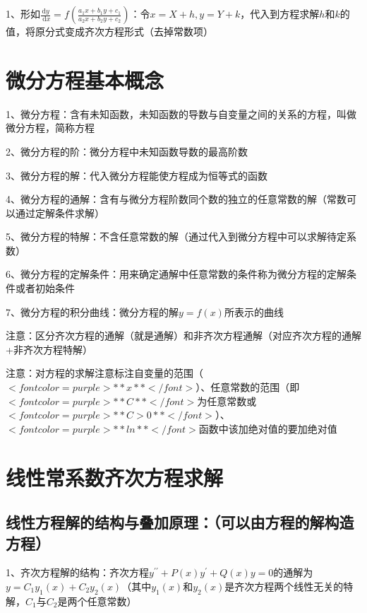 1、形如$ \frac{\mathrm{d} y}{\mathrm{~d} x}=f\left(\frac{a_{1} x+b_{1} y+c_{1}}{a_{2} x+b_{2} y+c_{2}}\right) $：令$ x=X+h, y=Y+k $，代入到方程求解$ h $和$ k $的值，将原分式变成齐次方程形式（去掉常数项）

\section{微分方程基本概念}

1、微分方程：含有未知函数，未知函数的导数与自变量之间的关系的方程，叫做微分方程，简称方程

2、微分方程的阶：微分方程中未知函数导数的最高阶数

3、微分方程的解：代入微分方程能使方程成为恒等式的函数

4、微分方程的通解：含有与微分方程阶数同个数的独立的任意常数的解（常数可以通过定解条件求解）

5、微分方程的特解：不含任意常数的解（通过代入到微分方程中可以求解待定系数）

6、微分方程的定解条件：用来确定通解中任意常数的条件称为微分方程的定解条件或者初始条件

7、微分方程的积分曲线：微分方程的解$ y=f(x) $所表示的曲线

注意：区分齐次方程的通解（就是通解）和非齐次方程通解（对应齐次方程的通解+非齐次方程特解）

注意：对方程的求解注意标注自变量的范围（$ <font color=purple>**x**</font> $）、任意常数的范围（即$ <font color=purple>**C**</font> $为任意常数或$ <font color=purple>**C>0**</font> $）、$ <font color=purple>**ln**</font> $函数中该加绝对值的要加绝对值

\section{线性常系数齐次方程求解}



\subsection{线性方程解的结构与叠加原理：（可以由方程的解构造方程）}

1、齐次方程解的结构：齐次方程$ y^{\prime \prime}+P(x) y^{\prime}+Q(x) y=0 $的通解为$ y=C_{1} y_{1}(x)+C_{2} y_{2}(x) $（其中$ y_{1}(x) $和$ y_{2}(x) $是齐次方程两个线性无关的特解，$ C_{1} $与$ C_{2} $是两个任意常数）

